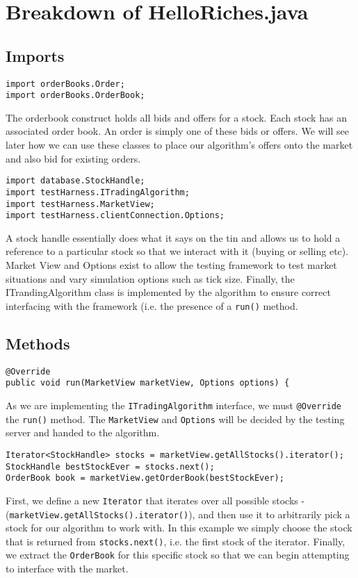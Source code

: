 \documentclass[11pt]{article}
\begin{document}
\section{Breakdown of HelloRiches.java}
\subsection{Imports}
\begin{lstlisting}
import orderBooks.Order;
import orderBooks.OrderBook;
\end{lstlisting}
The orderbook construct holds all bids and offers for a stock. Each stock has an associated order book. An order is simply one of these bids or offers. We will see later how we can use these classes to place our algorithm's offers onto the market and also bid for existing orders.\\
\begin{lstlisting}
import database.StockHandle;
import testHarness.ITradingAlgorithm;
import testHarness.MarketView;
import testHarness.clientConnection.Options;
\end{lstlisting}
A stock handle essentially does what it says on the tin and allows us to hold a reference to a particular stock so that we interact with it (buying or selling etc). Market View and Options exist to allow the testing framework to test market situations and vary simulation options such as tick size. Finally, the ITrandingAlgorithm class is implemented by the algorithm to ensure correct interfacing with the framework (i.e. the presence of a \texttt{run()} method.\\
\subsection{Methods}
\begin{lstlisting}
@Override
public void run(MarketView marketView, Options options) {
\end{lstlisting}
As we are implementing the \texttt{ITradingAlgorithm} interface, we must \texttt{@Override} the \texttt{run()} method. The \texttt{MarketView} and \texttt{Options} will be decided by the testing server and handed to the algorithm. \\

\begin{lstlisting}
Iterator<StockHandle> stocks = marketView.getAllStocks().iterator();
StockHandle bestStockEver = stocks.next();
OrderBook book = marketView.getOrderBook(bestStockEver);
\end{lstlisting}
First, we define a new \texttt{Iterator} that iterates over all possible stocks -(\texttt{marketView.getAllStocks().iterator()}), and then use it to arbitrarily pick a stock for our algorithm to work with. In this example we simply choose the stock that is returned from \texttt{stocks.next()}, i.e. the first stock of the iterator. Finally, we extract the \texttt{OrderBook} for this specific stock so that we can begin attempting to interface with the market.\\
\end{document}
